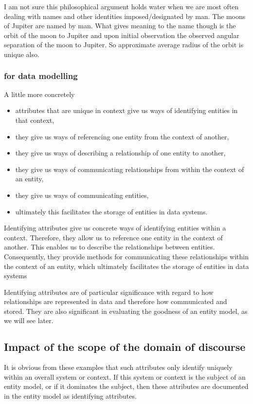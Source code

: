 \mynote 
I am not sure this philosophical argument holds water when we are most often dealing with names and other identities imposed/designated by man. The moons of Jupiter are named by man. What gives meaning to the name though is the orbit of the moon to Jupiter and upon initial observation the observed angular separation of the moon to Jupiter. So approximate average radius of the orbit is unique also. 

\subsubsection{for data modelling}
\mynote A little more concretely 
\begin{itemize}
\item attributes that are unique in context give us ways of identifying entities in that context, 
\item they give us ways of referencing one entity from the context of another, 
\item they give us ways of describing a relationship of one entity to another,
\item they give us ways of communicating relationships from within the context of an entity,
\item they give us ways of communicating entities, 
\item ultimately this facilitates the storage of entities in data systems. 
\end{itemize}

\mynote
Identifying attributes give us concrete ways of identifying entities within a context. Therefore, they allow us to reference one entity in the context of another. This enables us to describe the relationships between entities. Consequently, they provide methods for communicating these relationships within the context of an entity, which ultimately facilitates the storage of entities in data systems

\mynote Identifying attributes are of particular significance with regard to 
 how relationships are represented in data and therefore how communicated and stored.
They are also significant in evaluating the goodness of an entity model, as we will see later.


\subsection{Impact of the scope of the domain of discourse}
\mynote
It is obvious from these examples that such attributes only identify uniquely within an overall system or context. If this system or context is the subject of an entity model, or if it dominates the subject, then these attributes are documented in the entity model as identifying attributes. 

